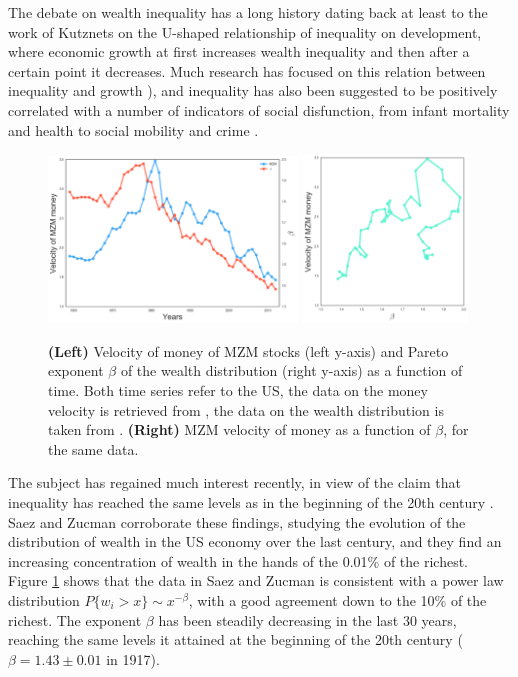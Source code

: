 The debate on wealth inequality has a long history dating back at least to the work of Kutznets \cite{Kuznets1955} on the U-shaped relationship of inequality on development, where economic growth at first increases wealth inequality and then after a certain point it decreases. Much research has focused on this relation between inequality and growth \cite{PerssonTabellini1994}), and inequality has also been suggested to be positively correlated with a number of indicators of social disfunction, from infant mortality and health to social mobility and crime \cite{TheSpirit}.

\begin{figure}%
\centering
\includegraphics[width=0.59\textwidth]{figs_ineq/data_1.png}
\includegraphics[width=0.39\textwidth]{figs_ineq/data_2.png}
\caption{\textbf{(Left)} Velocity of money of MZM stocks (left y-axis) and Pareto exponent $\beta$ of the wealth distribution (right y-axis) as a function of time. Both time series refer to the US, the data on the money velocity is retrieved from \cite{FRED}, the data on the wealth distribution is taken from \cite{SaezZucman2016}. \textbf{(Right)} MZM velocity of money as a function of $\beta$, for the same data.}
\label{Fig:data}
\end{figure}

The subject has regained much interest recently, in view of the claim that inequality has reached the same levels as in the beginning of the 20th century \cite{Piketty2001}. Saez and Zucman \cite{SaezZucman2016} corroborate these findings, studying the evolution of the distribution of wealth in the US economy over the last century, and they find an increasing concentration of wealth in the hands of the 0.01\% of the richest. Figure \ref{Fig:data} shows that the data in Saez and Zucman \cite{SaezZucman2016} is consistent with a power law distribution $P\{w_i>x\}\sim x^{-\beta}$, with a good agreement down to the 10\% of the richest. The exponent $\beta$ has been steadily decreasing in the last 30 years,  
reaching the same levels it attained at the beginning of the 20th century ($\beta=1.43\pm 0.01$ in 1917).

